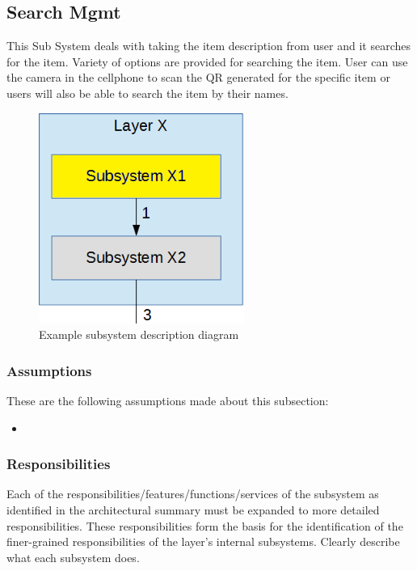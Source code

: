 \subsection{Search Mgmt}
This Sub System deals with taking the item description from user and it searches for the item. Variety of options are provided for searching the item. User can use the camera in the cellphone to scan the QR generated for the specific item or users will also be able to search the item by their names.

\begin{figure}[h!]
	\centering
 	\includegraphics[width=0.60\textwidth]{images/subsystem}
 \caption{Example subsystem description diagram}
\end{figure}

\subsubsection{Assumptions}
These are the following assumptions made about this subsection:
\begin{itemize}
    \item 
\end{itemize}

\subsubsection{Responsibilities}
Each of the responsibilities/features/functions/services of the subsystem as identified in the architectural summary must be expanded to more detailed responsibilities. These responsibilities form the basis for the identification of the finer-grained responsibilities of the layer's internal subsystems. Clearly describe what each subsystem does.

